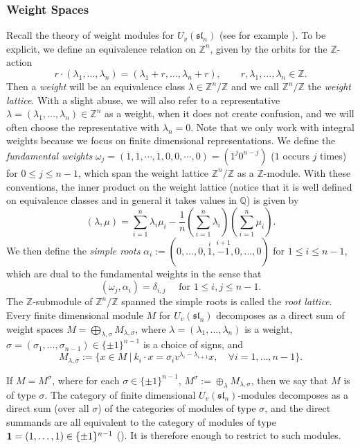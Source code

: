 \documentclass{amsart}
\numberwithin{equation}{section}
\theoremstyle{theorem}
\theoremstyle{definition}
\newcommand{\ZZ}{\mathbb{Z}}
\newcommand{\sll}{\mathfrak{sl}}
\newcommand{\uvsln}{U_v(\sll_n)}
\begin{document}
\subsubsection{Weight Spaces}\label{sec:weightspaces}
Recall the theory of weight modules for $\uvsln$ (see for example \cite[\S 5]{J}). To be explicit, we define an equivalence relation on $\ZZ^n$, given by the orbits for the $\ZZ$-action
$$r\cdot (\lambda_1,\ldots,\lambda_n)=(\lambda_1+r,\ldots,\lambda_n+r),\qquad r,\lambda_1,\ldots,\lambda_n\in\ZZ.$$ Then a \emph{weight} will be an equivalence class $\lambda\in\ZZ^n/\ZZ$ and we call $\ZZ^n/\ZZ$ the \emph{weight lattice}. With a slight abuse, we will also refer to a representative $\lambda=(\lambda_1,\ldots,\lambda_n)\in\ZZ^n$ as a weight, when it does not create confusion, and we will often choose the representative with $\lambda_n=0$. Note that we only work with integral weights because we focus on finite dimensional representations. We define the \emph{fundamental weights} $\omega_j=(1,1,\cdots,1,0,0,\cdots,0)=(1^j0^{n-j})$ ($1$ occurs $j$ times) for $0\leq j\leq n-1$, which span the weight lattice $\ZZ^n/\ZZ$ as a $\ZZ$-module. 
With these conventions, the inner product on the weight lattice (notice that it is well defined on equivalence classes and in general it takes values in $\mathbb{Q}$) is given by
\[(\lambda,\mu)=\sum_{i=1}^n\lambda_i\mu_i-\frac{1}{n}\left(\sum_{i=1}^n\lambda_i\right)\left(\sum_{i=1}^n\mu_i\right).\]
We then define the \emph{simple roots} 
$\alpha_i:=(0,\ldots,0,\stackrel{i}{1},\stackrel{i+1}{-1},0,\ldots,0)$ for $1\leq i\leq n-1$, which are dual to the fundamental weights in the sense that
\[(\omega_j,\alpha_i)=\delta_{i,j} \quad\text{ for } 1\leq i,j\leq n-1.\]
The $\ZZ$-submodule of $\ZZ^n/\ZZ$ spanned the simple roots is called the \emph{root lattice}.
Every finite dimensional module $M$ for $\uvsln$ decomposes as a direct sum of weight spaces $M=\bigoplus_{\lambda,\sigma}M_{\lambda,\sigma}$, where $\lambda=(\lambda_1,\ldots,\lambda_{n})$ is a weight, $\sigma=(\sigma_1,\ldots,\sigma_{n-1})\in\{\pm 1\}^{n-1}$ is a choice of signs, and
$$M_{\lambda,\sigma}:=\{x\in M~|~k_i\cdot x=\sigma_i v^{\lambda_i-\lambda_{i+1}}x,\quad\forall i=1,\ldots,n-1\}.$$

If $M=M^\sigma$, where for each $\sigma\in\{\pm 1\}^{n-1}$, $M^\sigma:=\oplus_{\lambda}M_{\lambda,\sigma}$, then we say that $M$ is of type $\sigma$. The category of finite dimensional $\uvsln$-modules decomposes as a direct sum (over all $\sigma$) of the categories of modules of type $\sigma$, and the direct summands are all equivalent to the category of modules of type $\bold{1}=(1,\ldots,1)\in\{\pm 1\}^{n-1}$ (\cite[\S 5.2]{J}). It is therefore enough to restrict to such modules.
\end{document}
